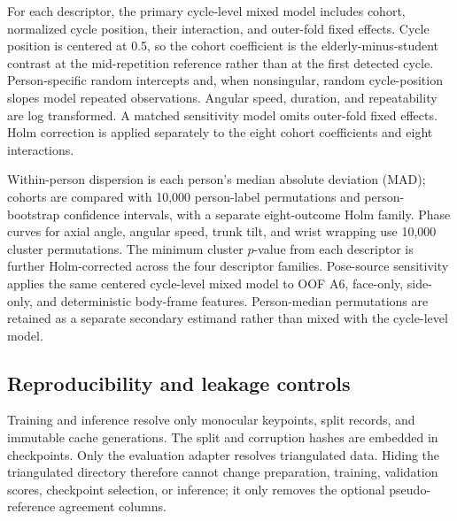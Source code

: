 For each descriptor, the primary cycle-level mixed model includes cohort,
normalized cycle position, their interaction, and outer-fold fixed effects.
Cycle position is centered at 0.5, so the cohort coefficient is the
elderly-minus-student contrast at the mid-repetition reference rather than at
the first detected cycle. Person-specific random intercepts and, when
nonsingular, random cycle-position slopes model repeated observations. Angular
speed, duration, and repeatability are log transformed. A matched sensitivity
model omits outer-fold fixed effects. Holm correction is applied separately to
the eight cohort coefficients and eight interactions.

Within-person dispersion is each person's median absolute deviation (MAD);
cohorts are compared with 10,000 person-label permutations and person-bootstrap
confidence intervals, with a separate eight-outcome Holm family. Phase curves
for axial angle, angular speed, trunk tilt, and wrist wrapping use 10,000
cluster permutations. The minimum cluster $p$-value from each descriptor is
further Holm-corrected across the four descriptor families. Pose-source
sensitivity applies the same centered cycle-level mixed model to OOF A6,
face-only, side-only, and deterministic body-frame features. Person-median
permutations are retained as a separate secondary estimand rather than mixed
with the cycle-level model.

\subsection{Reproducibility and leakage controls}

Training and inference resolve only monocular keypoints, split records, and
immutable cache generations. The split and corruption hashes are embedded in
checkpoints. Only the evaluation adapter resolves triangulated data. Hiding the
triangulated directory therefore cannot change preparation, training,
validation scores, checkpoint selection, or inference; it only removes the
optional pseudo-reference agreement columns.
